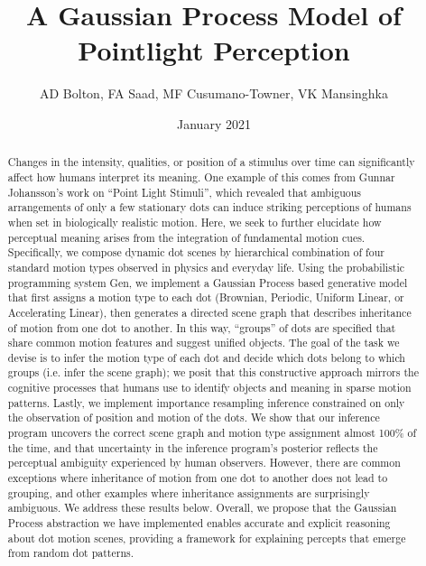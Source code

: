 \documentclass{scrartcl}
\title{A Gaussian Process Model of Pointlight Perception}
\author{AD Bolton, FA Saad, MF Cusumano-Towner, VK Mansinghka}
\date{January 2021}
\begin{document}
\maketitle

\begin{abstract}
  Changes in the intensity, qualities, or position of a stimulus over time can significantly affect how humans interpret its meaning. One example of this comes from Gunnar Johansson's work on ``Point Light Stimuli'', which revealed that ambiguous arrangements of only a few stationary dots can induce striking perceptions of humans when set in biologically realistic motion. Here, we seek to further elucidate how perceptual meaning arises from the integration of fundamental motion cues. Specifically, we compose dynamic dot scenes by hierarchical combination of four standard motion types observed in physics and everyday life. Using the probabilistic programming system Gen, we implement a Gaussian Process based generative model that first assigns a motion type to each dot (Brownian, Periodic, Uniform Linear, or Accelerating Linear), then generates a directed scene graph that describes inheritance of motion from one dot to another. In this way, ``groups'' of dots are specified that share common motion features and suggest unified objects. The goal of the task we devise is to infer the motion type of each dot and decide which dots belong to which groups (i.e. infer the scene graph); we posit that this constructive approach mirrors the cognitive processes that humans use to identify objects and meaning in sparse motion patterns. Lastly, we implement importance resampling inference constrained on only the observation of position and motion of the dots. We show that our inference program uncovers the correct scene graph and motion type assignment almost 100\% of the time, and that uncertainty in the inference program's posterior reflects the perceptual ambiguity experienced by human observers. However, there are common exceptions where inheritance of motion from one dot to another does not lead to grouping, and other examples where inheritance assignments are surprisingly ambiguous. We address these results below. Overall, we propose that the Gaussian Process abstraction we have implemented enables accurate and explicit reasoning about dot motion scenes, providing a framework for explaining percepts that emerge from random dot patterns.
\end{abstract}

\vspace{10mm}
\end{document}
